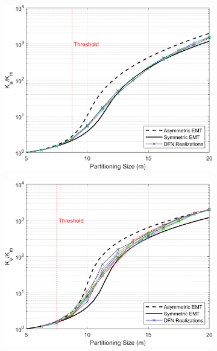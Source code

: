 \documentclass[Supplementary.tex]{subfiles}
\begin{document}
\begin{figure}[ht]
\begin{subfigure}{0.3\textwidth}
        \includegraphics[width=\textwidth]{FSU/Plot_FSU_Case_11_nohead.png}
        \label{fig:FSU_11}
    \end{subfigure}
    \begin{subfigure}{0.3\textwidth}
        \includegraphics[width=\textwidth]{FSU/Plot_FSU_Case_12_nohead.png}
        \label{fig:FSU_12}
    \end{subfigure}
    \\
    \begin{subfigure}{0.3\textwidth}

\end{subfigure}
\end{figure}
\end{document}
